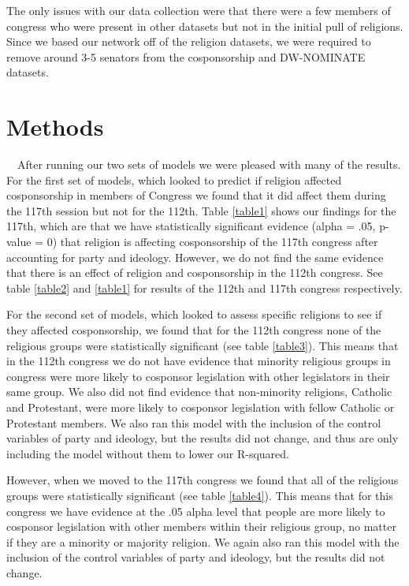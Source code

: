 \documentclass[Royal,times,sageh]{sagej}
\begin{document}
The only issues with our data collection were that there were a few members of congress who were present in other datasets but not in the initial pull of religions. Since we based our network off of the religion datasets, we were required to remove around 3-5 senators from the cosponsorship and DW-NOMINATE datasets.

\hypertarget{methods}{%
\section{Methods}\label{methods}}

\doublespacing

~~After running our two sets of models we were pleased with many of the results. For the first set of models, which looked to predict if religion affected cosponsorship in members of Congress we found that it did affect them during the 117th session but not for the 112th. Table \ref{table1} shows our findings for the 117th, which are that we have statistically significant evidence (alpha = .05, p-value = 0) that religion is affecting cosponsorship of the 117th congress after accounting for party and ideology. However, we do not find the same evidence that there is an effect of religion and cosponsorship in the 112th congress. See table \ref{table2} and \ref{table1} for results of the 112th and 117th congress respectively.

For the second set of models, which looked to assess specific religions to see if they affected cosponsorship, we found that for the 112th congress none of the religious groups were statistically significant (see table \ref{table3}). This means that in the 112th congress we do not have evidence that minority religious groups in congress were more likely to cosponsor legislation with other legislators in their same group. We also did not find evidence that non-minority religions, Catholic and Protestant, were more likely to cosponsor legislation with fellow Catholic or Protestant members. We also ran this model with the inclusion of the control variables of party and ideology, but the results did not change, and thus are only including the model without them to lower our R-squared.

However, when we moved to the 117th congress we found that all of the religious groups were statistically significant (see table \ref{table4}). This means that for this congress we have evidence at the .05 alpha level that people are more likely to cosponsor legislation with other members within their religious group, no matter if they are a minority or majority religion. We again also ran this model with the inclusion of the control variables of party and ideology, but the results did not change.
\end{document}
